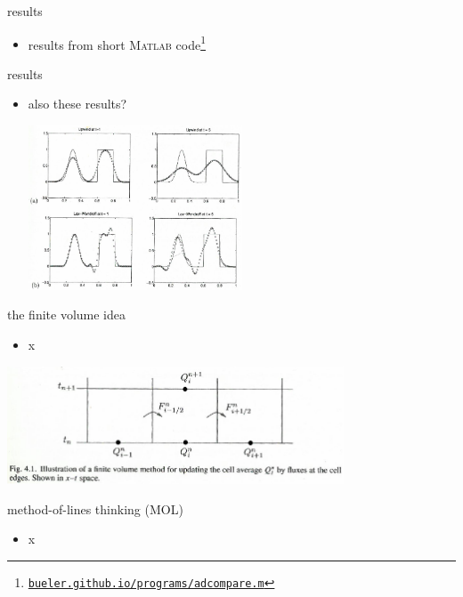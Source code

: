 \documentclass[10pt,hyperref]{beamer}
\newcommand{\Matlab}{\textsc{Matlab}\xspace}
\begin{document}
\begin{frame}{results}

\begin{itemize}
\item results from short \Matlab code\footnote{\href{http://bueler.github.io/programs/adcompare.m}{\texttt{bueler.github.io/programs/adcompare.m}}}
\end{itemize}
\end{frame}



\begin{frame}{results}

\begin{itemize}
\item also these results?

\includegraphics[width=0.5\textwidth]{figs/leveque6p1}
\end{itemize}
\end{frame}


\begin{frame}{the finite volume idea}

\begin{itemize}
\item x
\end{itemize}

\begin{center}
\includegraphics[width=0.75\textwidth]{figs/leveque4p1}
\end{center}
\end{frame}


\begin{frame}{method-of-lines thinking (MOL)}

\begin{itemize}
\item x
\end{itemize}
\end{frame}
\end{document}
